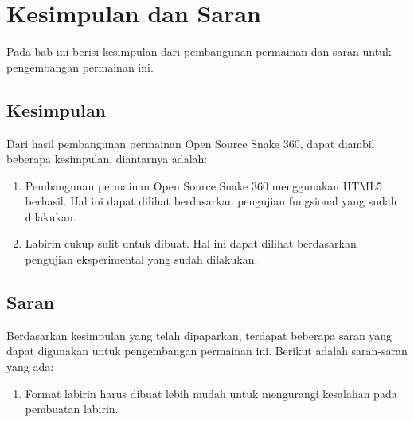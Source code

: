 \chapter{Kesimpulan dan Saran}
\label{chap:kesimpulansaran}

Pada bab ini berisi kesimpulan dari pembangunan permainan dan saran untuk pengembangan permainan ini.

\section{Kesimpulan}
Dari hasil pembangunan permainan Open Source Snake 360, dapat diambil beberapa kesimpulan, diantarnya adalah: 

\begin{enumerate}
	\item Pembangunan permainan Open Source Snake 360 menggunakan HTML5 berhasil. Hal ini dapat dilihat berdasarkan pengujian fungsional yang sudah dilakukan.
	\item Labirin cukup sulit untuk dibuat. Hal ini dapat dilihat berdasarkan pengujian eksperimental yang sudah dilakukan.
\end{enumerate} 

\section{Saran}
Berdasarkan kesimpulan yang telah dipaparkan, terdapat beberapa saran yang dapat digunakan untuk pengembangan permainan ini. Berikut adalah saran-saran yang ada:

\begin{enumerate}
	\item Format labirin harus dibuat lebih mudah untuk mengurangi kesalahan pada pembuatan labirin.
\end{enumerate}